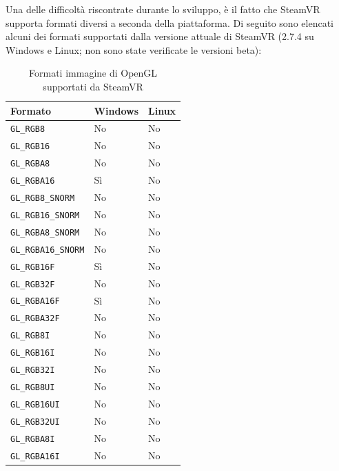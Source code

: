 \documentclass[twoside]{supsistudent}
\begin{document}
\newpage

Una delle difficoltà riscontrate durante lo sviluppo, è il fatto che SteamVR supporta formati diversi a seconda della piattaforma. Di seguito sono elencati alcuni dei formati supportati dalla versione attuale di SteamVR (2.7.4 su Windows e Linux; non sono state verificate le versioni beta):

\begin{table}[H]
  \caption{Formati immagine di OpenGL supportati da SteamVR}
  \begin{center}
    \begin{tabular}{ l l l }
      Formato                    & Windows & Linux \\
      \hline
      \texttt{GL\_RGB8}          & No      & No    \\
      \texttt{GL\_RGB16}         & No      & No    \\
      \texttt{GL\_RGBA8}         & No      & No    \\
      \texttt{GL\_RGBA16}        & Sì      & No    \\
      \texttt{GL\_RGB8\_SNORM}   & No      & No    \\
      \texttt{GL\_RGB16\_SNORM}  & No      & No    \\
      \texttt{GL\_RGBA8\_SNORM}  & No      & No    \\
      \texttt{GL\_RGBA16\_SNORM} & No      & No    \\
      \texttt{GL\_RGB16F}        & Sì      & No    \\
      \texttt{GL\_RGB32F}        & No      & No    \\
      \texttt{GL\_RGBA16F}       & Sì      & No    \\
      \texttt{GL\_RGBA32F}       & No      & No    \\
      \texttt{GL\_RGB8I}         & No      & No    \\
      \texttt{GL\_RGB16I}        & No      & No    \\
      \texttt{GL\_RGB32I}        & No      & No    \\
      \texttt{GL\_RGB8UI}        & No      & No    \\
      \texttt{GL\_RGB16UI}       & No      & No    \\
      \texttt{GL\_RGB32UI}       & No      & No    \\
      \texttt{GL\_RGBA8I}        & No      & No    \\
      \texttt{GL\_RGBA16I}       & No      & No    \\

\end{tabular}
\end{center}
\end{table}
\end{document}
